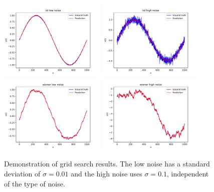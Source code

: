 \begin{figure}
    \centering
    \includegraphics[width=0.45\textwidth]{figures/iid_low_noise.pdf}
    \includegraphics[width=0.45\textwidth]{figures/iid_high_noise.pdf}
    \includegraphics[width=0.45\textwidth]{figures/wiener_low_noise.pdf}
    \includegraphics[width=0.45\textwidth]{figures/wiener_high_noise.pdf}
    \caption{Demonstration of grid search results. The low noise has a
    standard deviation of $\sigma =0.01$ and the high noise uses $\sigma=0.1$,
    independent of the type of noise.}
    \label{fig:sineresult}
\end{figure}

